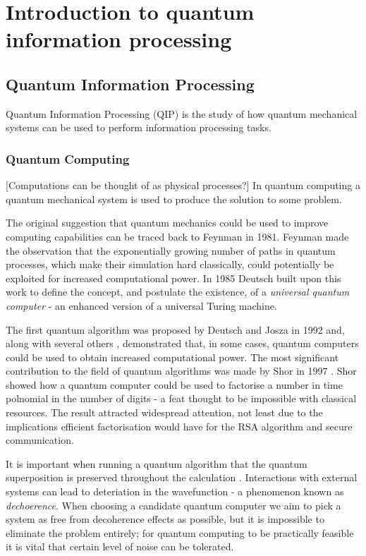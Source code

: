 \chapter{Introduction to quantum information processing} 
\label{ch:Introduction}

\section{Quantum Information Processing}

Quantum Information Processing (QIP) is the study of how quantum mechanical systems can be used to perform information processing tasks. 

\subsection{Quantum Computing}
[Computations can be thought of as physical processes?]
In quantum computing a quantum mechanical system is used to produce the solution to some problem.

The original suggestion that quantum mechanics could be used to improve computing capabilities can be traced back to Feynman \cite{feynman_82} in 1981. Feynman made the observation that the exponentially growing number of paths in quantum processes, which make their simulation hard classically, could potentially be exploited for increased computational power. In 1985 Deutsch built upon this work to define the concept, and postulate the existence, of a \textit{universal quantum computer}\cite{deutsch_85} - an enhanced version of a universal Turing machine. 

The first quantum algorithm was proposed by Deutsch and Josza \cite{deutsch_jozsa_92} in 1992 and, along with several others \cite{simon_94, grovers_search}, demonstrated that, in some cases, quantum computers could be used to obtain increased computational power. The most significant contribution to the field of quantum algorithms was made by Shor in 1997 \cite{shors_algorithm}. Shor showed how a quantum computer could be used to factorise a number in time polnomial in the number of digits - a feat thought to be impossible with classical resources. The result attracted widespread attention, not least due to the implications efficient factorisation would have for the RSA algorithm \cite{rsa} and secure communication.

It is important when running a quantum algorithm that the quantum superposition is preserved throughout the calculation \cite{nature_cq_review_10}. Interactions with external systems can lead to deteriation in the wavefunction - a phenomenon known as \textit{dechoerence}. When choosing a candidate quantum computer we aim to pick a system as free from decoherence effects as possible, but it is impossible to eliminate the problem entirely; for quantum computing to be practically feasible it is vital that certain level of noise can be tolerated. 

